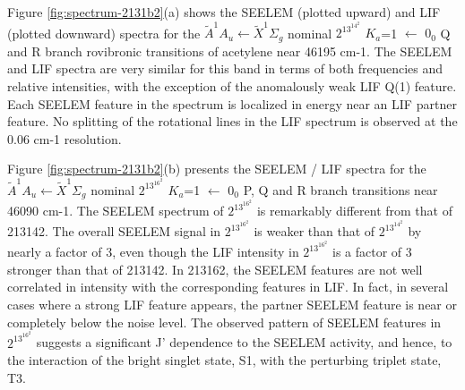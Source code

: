 \documentclass[12pt,draft]{mitthesis}
\begin{document}
Figure \ref{fig:spectrum-2131b2}(a) shows the SEELEM (plotted upward)
and LIF (plotted downward) spectra for the $\tilde{A}^1A_u \leftarrow
\tilde{X}^1\Sigma_g$ nominal $2^13^14^2$ $K_a$=1 $\leftarrow$ $0_0$ Q
and R branch rovibronic transitions of acetylene near 46195 cm-1. The
SEELEM and LIF spectra are very similar for this band in terms of both
frequencies and relative intensities, with the exception of the
anomalously weak LIF Q(1) feature. Each SEELEM feature in the spectrum
is localized in energy near an LIF partner feature. No splitting of
the rotational lines in the LIF spectrum is observed at the 0.06 cm-1
resolution.

Figure \ref{fig:spectrum-2131b2}(b) presents the SEELEM / LIF spectra
for the $\tilde{A}^1A_u \leftarrow \tilde{X}^1\Sigma_g$ nominal
$2^13^16^2$ $K_a$=1 $\leftarrow$ $0_0$ P, Q and R branch transitions
near 46090 cm-1. The SEELEM spectrum of $2^13^16^2$ is remarkably different
from that of 213142. The overall SEELEM signal in $2^13^16^2$ is weaker
than that of $2^13^14^2$ by nearly a factor of 3, even though the LIF
intensity in $2^13^16^2$ is a factor of 3 stronger than that of 213142.  In
213162, the SEELEM features are not well correlated in intensity with
the corresponding features in LIF. In fact, in several cases where a
strong LIF feature appears, the partner SEELEM feature is near or
completely below the noise level. The observed pattern of SEELEM
features in $2^13^16^2$ suggests a significant J' dependence to the SEELEM
activity, and hence, to the interaction of the bright singlet state,
S1, with the perturbing triplet state, T3.
\end{document}
